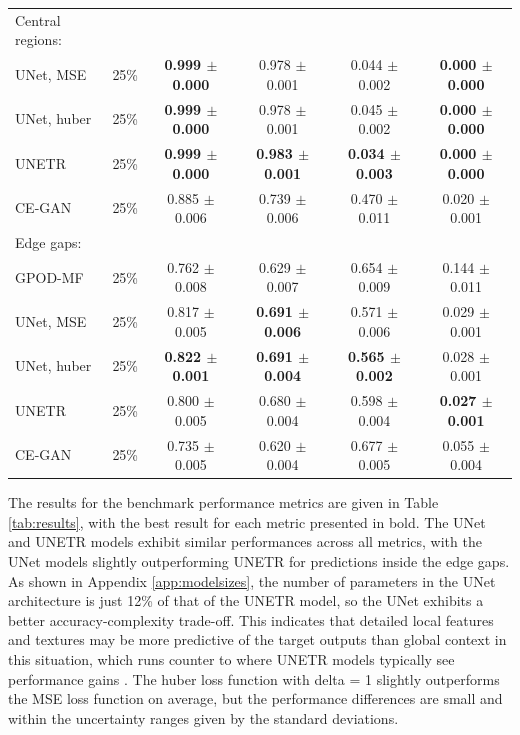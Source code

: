 \documentclass{article}
\begin{document}
\begin{table}[t]
\begin{tabular}{lccccc}
    \midrule 
    Central regions: & & & & & \\
    \; UNet, MSE & 25\% & \textbf{0.999 $\pm$ 0.000} & 0.978 $\pm$ 0.001 & 0.044 $\pm$ 0.002 & \textbf{0.000 $\pm$ 0.000} \\
    \; UNet, huber & 25\% & \textbf{0.999 $\pm$ 0.000} & 0.978 $\pm$ 0.001  &  0.045 $\pm$ 0.002  & \textbf{0.000 $\pm$ 0.000} \\
    \; UNETR & 25\% & \textbf{0.999 $\pm$ 0.000} & \textbf{0.983 $\pm$ 0.001} & \textbf{0.034 $\pm$ 0.003}  & \textbf{0.000 $\pm$ 0.000} \\
    \; CE-GAN & 25\% & 0.885 $\pm$ 0.006 & 0.739 $\pm$ 0.006 & 0.470 $\pm$ 0.011  & 0.020 $\pm$ 0.001 \\
    \midrule
    Edge gaps: &&&&&\\
    \; GPOD-MF & 25\% & 0.762 $\pm$ 0.008 & 0.629 $\pm$ 0.007 & 0.654 $\pm$ 0.009 & 0.144 $\pm$ 0.011 \\
    \; UNet, MSE & 25\% & 0.817 $\pm$ 0.005 & \textbf{0.691 $\pm$ 0.006} & 0.571 $\pm$ 0.006 & 0.029 $\pm$ 0.001 \\
    \; UNet, huber & 25\% & \textbf{0.822 $\pm$ 0.001} & \textbf{0.691 $\pm$ 0.004}  &  \textbf{0.565 $\pm$ 0.002}  & 0.028 $\pm$ 0.001 \\
    \; UNETR & 25\% & 0.800 $\pm$ 0.005 & 0.680 $\pm$ 0.004 & 0.598 $\pm$ 0.004  & \textbf{0.027 $\pm$ 0.001} \\
    \; CE-GAN & 25\% & 0.735 $\pm$ 0.005 & 0.620 $\pm$ 0.004 & 0.677 $\pm$ 0.005  & 0.055 $\pm$ 0.004 \\
    \bottomrule
  \end{tabular}
\end{table}

The results for the benchmark performance metrics are given in Table \ref{tab:results}, with the best result for each metric presented in bold. The UNet and UNETR models exhibit similar performances across all metrics, with the UNet models slightly outperforming UNETR for predictions inside the edge gaps. As shown in Appendix \ref{app:modelsizes}, the number of parameters in the UNet architecture is just 12\% of that of the UNETR model, so the UNet exhibits a better accuracy-complexity trade-off. This indicates that detailed local features and textures may be more predictive of the target outputs than global context in this situation, which runs counter to where UNETR models typically see performance gains \cite{kang2023new,jiang2023transcfd,xu2023estimation}. The huber loss function with delta = 1 slightly outperforms the MSE loss function on average, but the performance differences are small and within the uncertainty ranges given by the standard deviations. 
\end{document}
